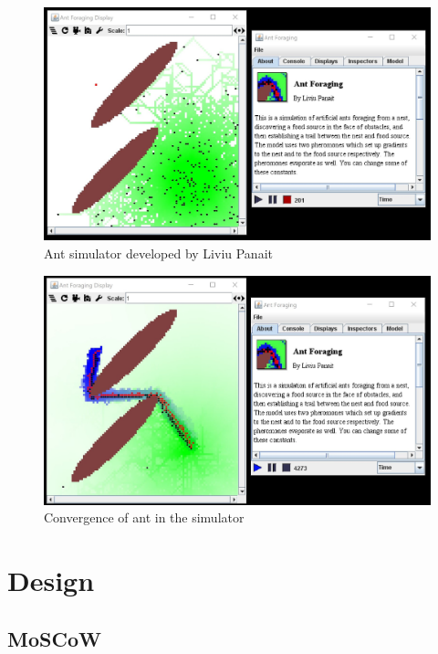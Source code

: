 \documentclass[a4paper, oneside, 11pt]{report}
\begin{document}
\begin{figure}[htb]
	\includegraphics[width=1.0 \columnwidth]{MASON_Ant.jpg}
	\caption{Ant simulator developed by Liviu Panait \citep{Ant_Simulator}}
	\label{fig:MASON_Ant}
\end{figure}

\begin{figure}[htb]
	\includegraphics[width=1.0 \columnwidth]{MASON_Ant_Converged.jpg}
	\caption{Convergence of ant in the simulator \citep{Ant_Simulator}}
	\label{fig:MASON_Ant_Converged}
\end{figure}

\chapter{Design}
\label{chap:design}
\section{MoSCoW}
\end{document}
